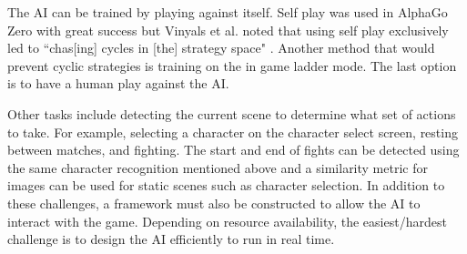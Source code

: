 \documentclass[12pt,a4paper, twocolumn]{article}
\begin{document}
The AI can be trained by playing against itself.
Self play was used in AlphaGo Zero \cite{silver2017mastering} with great success but
Vinyals et al. noted that using self play exclusively led to ``chas[ing] cycles in [the] strategy space" \cite{vinyals2019grandmaster}.
Another method that would prevent cyclic strategies is training on the in game ladder mode.
The last option is to have a human play against the AI.

Other tasks include detecting the current scene to determine what set of actions to take.
For example, selecting a character on the character select screen, resting between matches, and fighting.
The start and end of fights can be detected using the same character recognition mentioned above and a similarity metric for images can be used for static scenes such as character selection. 
In addition to these challenges, a framework must also be constructed to allow the AI to interact with the game.
Depending on resource availability, the easiest/hardest challenge is to design the AI efficiently to run in real time.

\newpage


\end{document}
